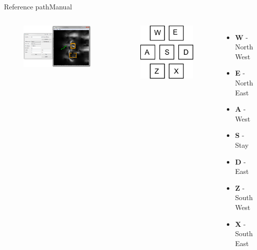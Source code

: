 \begin{frame}{Reference path}{Manual}

\begin{columns}
\begin{figure}
\centering
\includegraphics[width = \textwidth]{./screenshot/manual_reference_path.png}
\end{figure}

\begin{minipage}{\textwidth}
\begin{figure}
\centering
\includegraphics[width = .5\textwidth]{./figure/keyboard_op.pdf}
\end{figure}
\begin{itemize}
\item \textbf{W} - North West
\item \textbf{E} - North East
\item \textbf{A} - West 
\item \textbf{S} - Stay
\item \textbf{D} - East
\item \textbf{Z} - South West
\item \textbf{X} - South East
\end{itemize}
\end{minipage}
\end{columns}

\end{frame}

